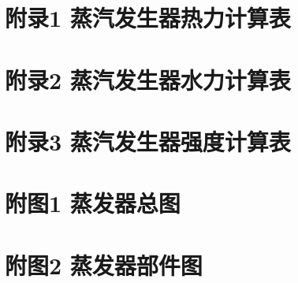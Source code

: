 \setcounter{page}{1}
\begin{appendices}
	\newpage
	\section{附录1 蒸汽发生器热力计算表}
	

	\newpage
	\section{附录2 蒸汽发生器水力计算表}
	

	\newpage
	\section{附录3 蒸汽发生器强度计算表}
	

	\newpage
	\section{附图1 蒸发器总图}
	

	\newpage
	\section{附图2 蒸发器部件图}
	
\end{appendices}
